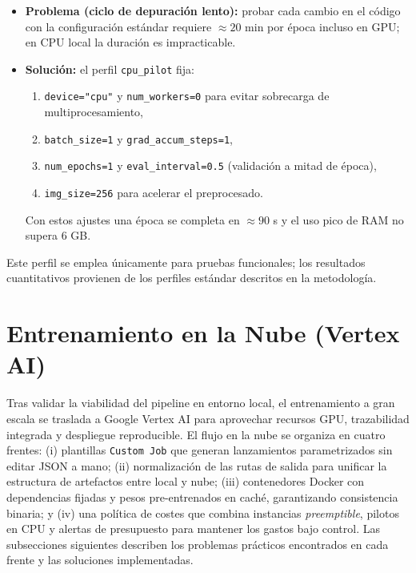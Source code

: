 \begin{itemize}
   \item \textbf{Problema (ciclo de depuración lento):} probar cada cambio en el código con la configuración estándar requiere \(\approx 20\) min por época incluso en GPU; en CPU local la duración es impracticable.
   \item \textbf{Solución:} el perfil \texttt{cpu\_pilot} fija:
         \begin{enumerate}
            \item \texttt{device="cpu"} y \texttt{num\_workers=0} para evitar sobrecarga de multiprocesamiento,
            \item \texttt{batch\_size=1} y \texttt{grad\_accum\_steps=1},
            \item \texttt{num\_epochs=1} y \texttt{eval\_interval=0.5} (validación a mitad de época),
            \item \texttt{img\_size=256} para acelerar el preprocesado.
         \end{enumerate}
         Con estos ajustes una época se completa en \(\approx 90\) s y el uso pico de RAM no supera 6 GB.
\end{itemize}

Este perfil se emplea únicamente para pruebas funcionales; los resultados cuantitativos provienen de los perfiles estándar descritos en la metodología.

\section{Entrenamiento en la Nube (Vertex AI)}\label{sec:vertex_ai}

Tras validar la viabilidad del pipeline en entorno local, el entrenamiento a gran escala se traslada a Google Vertex AI para aprovechar recursos GPU, trazabilidad integrada y despliegue reproducible.
El flujo en la nube se organiza en cuatro frentes: (i) plantillas \texttt{Custom Job} que generan lanzamientos parametrizados sin editar JSON a mano; (ii) normalización de las rutas de salida para unificar la estructura de artefactos entre local y nube; (iii) contenedores Docker con dependencias fijadas y pesos pre-entrenados en caché, garantizando consistencia binaria; y (iv) una política de costes que combina instancias \emph{preemptible}, pilotos en CPU y alertas de presupuesto para mantener los gastos bajo control.
Las subsecciones siguientes describen los problemas prácticos encontrados en cada frente y las soluciones implementadas.


